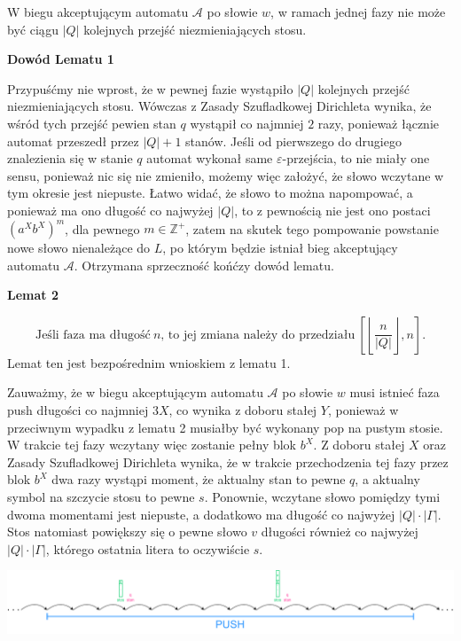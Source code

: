 \documentclass[12pt]{article}
\begin{document}
	
	
	W biegu akceptującym automatu \(\mathcal{A}\) po słowie \(w\), w ramach
	jednej fazy nie może być ciągu \(\left| Q \right|\) kolejnych przejść
	niezmieniających stosu.
	
	\medskip
	
	\textbf{Dowód Lematu 1}
	
	Przypuśćmy nie wprost, że w pewnej fazie wystąpiło \(\left| Q \right|\)
	kolejnych przejść niezmieniających stosu. Wówczas z Zasady Szufladkowej
	Dirichleta wynika, że wśród tych przejść pewien stan \(q\) wystąpił co
	najmniej \(2\) razy, ponieważ łącznie automat przeszedł przez \(\left| Q
	\right| + 1\) stanów. Jeśli od pierwszego do drugiego znalezienia się w
	stanie \(q\) automat wykonał same \(\varepsilon\)-przejścia, to nie miały
	one sensu, ponieważ nic się nie zmieniło, możemy więc założyć, że słowo
	wczytane w tym okresie jest niepuste. Łatwo widać, że słowo to można
	napompować, a ponieważ ma ono długość co najwyżej \(\left| Q \right|\), to z
	pewnością nie jest ono postaci \(\left( a^{X} b^{X} \right) ^ m\), dla
	pewnego \(m \in \mathbb{Z}^{+}\), zatem na skutek tego pompowanie powstanie
	nowe słowo nienależące do \(L\), po którym będzie istniał bieg akceptujący
	automatu \(\mathcal{A}\). Otrzymana sprzeczność końćzy dowód lematu.
	
	\medskip
	
	\textbf{Lemat 2}
	
	\[ \text{Jeśli faza ma długość} \ n
	\text{, to jej zmiana należy do przedziału} \ \left[ \left\lfloor
	\frac{n}{\left| Q \right|} \right\rfloor, n \right] \text{.} \]
	Lemat ten jest bezpośrednim wnioskiem z lematu 1.
	
	\medskip
	
	Zauważmy, że w biegu akceptującym automatu \(\mathcal{A}\) po słowie \(w\)
	musi istnieć faza push długości co najmniej \(3X\), co wynika z doboru
	stałej \(Y\), ponieważ w przeciwnym wypadku z lematu 2 musiałby być wykonany
	pop na pustym stosie. W trakcie tej fazy wczytany więc zostanie pełny blok
	\(b^{X}\). Z doboru stałej \(X\) oraz Zasady Szufladkowej Dirichleta wynika,
	że w trakcie przechodzenia tej fazy przez blok \(b^{X}\) dwa razy wystąpi
	moment, że aktualny stan to pewne \(q\), a aktualny symbol na szczycie stosu
	to pewne \(s\). Ponownie, wczytane słowo pomiędzy tymi dwoma momentami jest
	niepuste, a dodatkowo ma długość co najwyżej \(\left| Q \right| \cdot \left|
	\Gamma \right|\). Stos natomiast powiększy się o pewne słowo \(v\) długości
	również co najwyżej \(\left| Q \right| \cdot \left| \Gamma \right|\),
	którego ostatnia litera to oczywiście \(s\).
	\begin{center}
		\includegraphics[width = 0.9 \textwidth]{./image-1.pdf}
	\end{center}
	
\end{document}
